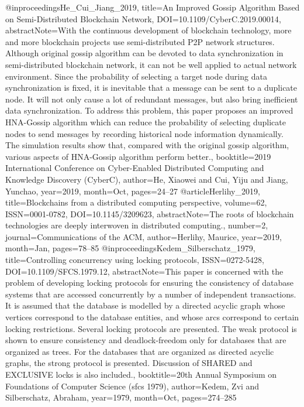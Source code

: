 {{ @inproceedings{He_Cui_Jiang_2019, title={An Improved Gossip Algorithm Based on Semi-Distributed Blockchain Network}, DOI={10.1109/CyberC.2019.00014}, abstractNote={With the continuous development of blockchain technology, more and more blockchain projects use semi-distributed P2P network structures. Although original gossip algorithm can be devoted to data synchronization in semi-distributed blockchain network, it can not be well applied to actual network environment. Since the probability of selecting a target node during data synchronization is fixed, it is inevitable that a message can be sent to a duplicate node. It will not only cause a lot of redundant messages, but also bring inefficient data synchronization. To address this problem, this paper proposes an improved HNA-Gossip algorithm which can reduce the probability of selecting duplicate nodes to send messages by recording historical node information dynamically. The simulation results show that, compared with the original gossip algorithm, various aspects of HNA-Gossip algorithm perform better.}, booktitle={2019 International Conference on Cyber-Enabled Distributed Computing and Knowledge Discovery (CyberC)}, author={He, Xiaowei and Cui, Yiju and Jiang, Yunchao}, year={2019}, month={Oct}, pages={24–27} }
 @article{Herlihy_2019, title={Blockchains from a distributed computing perspective}, volume={62}, ISSN={0001-0782}, DOI={10.1145/3209623}, abstractNote={The roots of blockchain technologies are deeply interwoven in distributed computing.}, number={2}, journal={Communications of the ACM}, author={Herlihy, Maurice}, year={2019}, month={Jan}, pages={78–85} }
 @inproceedings{Kedem_Silberschatz_1979, title={Controlling concurrency using locking protocols}, ISSN={0272-5428}, DOI={10.1109/SFCS.1979.12}, abstractNote={This paper is concerned with the problem of developing locking protocols for ensuring the consistency of database systems that are accessed concurrently by a number of independent transactions. It is assumed that the database is modelled by a directed acyclic graph whose vertices correspond to the database entities, and whose arcs correspond to certain locking restrictions. Several locking protocols are presented. The weak protocol is shown to ensure consistency and deadlock-freedom only for databases that are organized as trees. For the databases that are organized as directed acyclic graphs, the strong protocol is presented. Discussion of SHARED and EXCLUSIVE locks is also included.}, booktitle={20th Annual Symposium on Foundations of Computer Science (sfcs 1979)}, author={Kedem, Zvi and Silberschatz, Abraham}, year={1979}, month={Oct}, pages={274–285} }
}}

